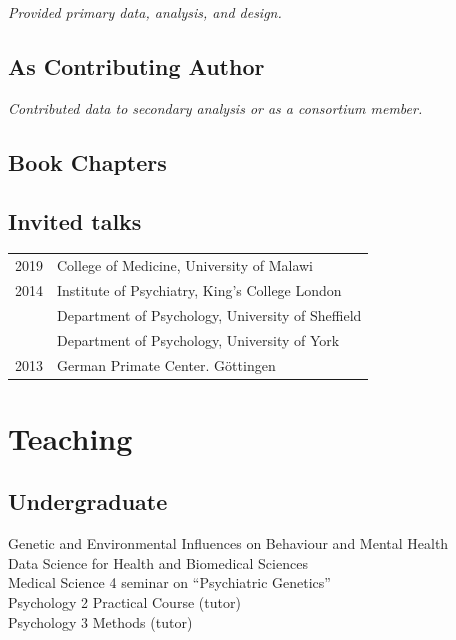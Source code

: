 \documentclass[11pt]{article}
\begin{document}
\textit{Provided primary data, analysis, and design.} 

\printbibliography[type=article,keyword=main,heading=none]

\subsection*{As Contributing Author}

\textit{Contributed data to secondary analysis or as a consortium member.}

\printbibliography[type=article,keyword=contrib,heading=none]

\subsection*{Book Chapters}

\printbibliography[type=inbook,heading=none]

\subsection*{Invited talks}

\begin{tabular}{p{3cm}p{12cm}}
	
2019 & College of Medicine, University of Malawi \\
	
2014 & Institute of Psychiatry, King's College London \\

     & Department of Psychology, University of Sheffield \\

    & Department of Psychology, University of York \\

2013 & German Primate Center. Göttingen

\end{tabular}


\section*{Teaching}

\subsection*{Undergraduate}

Genetic and Environmental Influences on Behaviour and Mental Health \\
Data Science for Health and Biomedical Sciences \\
Medical Science 4 seminar on ``Psychiatric Genetics'' \\ 
Psychology 2 Practical Course (tutor) \\
Psychology 3 Methods (tutor)
\end{document}
